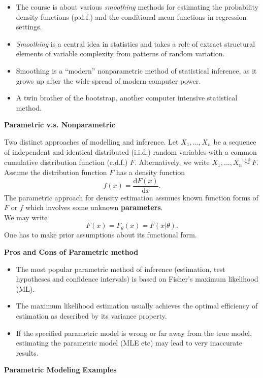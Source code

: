 \documentclass[19pt,landscaoe]{article}
\begin{document}
\begin{minipage}{.9\textwidth}
    \Large
\begin{itemize}
\item The course is about various {\it smoothing} methods for estimating the probability density functions (p.d.f.) and the conditional mean functions in regression settings.
\item {\it Smoothing} is a central idea in statistics and takes a role of extract structural elements of variable complexity from patterns of random variation. 
\item Smoothing is a ``modern'' nonparametric method of statistical inference, as it grows up after the wide-spread of modern computer power. 
\item A twin brother of the bootstrap, another computer intensive statistical
method.

\end{itemize}
\end{minipage}
\newpage
{\Large\centerline{\textbf{Parametric v.s. Nonparametric}}}
\vskip25pt
\begin{minipage}{.9\textwidth}
    \Large
Two distinct approaches of modelling and inference. 
\vskip 5pt
Let $X_1,\dots,X_n$ be a sequence of independent and identical distributed (i.i.d.) random variables with a common cumulative distribution function (c.d.f.) $F$. Alternatively, we write $X_1,\dots,X_n\overset{\mathrm{i.i.d.}}{\sim}F$. \\Assume the distribution function $F$ has a density function $$f(x)=\frac{\mathrm{d}F(x)}{\mathrm{d}x}.$$  
The parametric approach for density estimation assmues known function forms of $F$ or $f$ which involves some unknown {\bf parameters}.\\ We may write
$$F(x)=F_\theta(x)=F(x|\theta).$$
One has to make prior assumptions about its functional form.
\end{minipage}
\newpage
{\LARGE\centerline{\textbf{Pros and Cons of Parametric method}}}
\vskip25pt
\begin{minipage}{.9\textwidth}
    \Large
\begin{itemize}
\item The most popular parametric method of inference (estimation, test hypotheses and confidence intervals) is based on Fisher's maximum likelihood (ML).
\item The maximum likelihood estimation usually achieves the optimal efficiency of estimation as described by its variance property.
\item If the specified parametric model is wrong or far away from the true model, estimating the parametric model (MLE etc) may lead to very inaccurate results. 

\end{itemize}
\end{minipage}
\newpage
{\LARGE{\textbf{Parametric Modeling}}}
\vskip25pt
{\Large\bf{Examples}}
   
\end{document}
